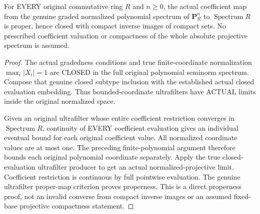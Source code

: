 \begin{theorem}
\label{spectrum:normalized-projective-coefficient-proper}
For EVERY original commutative ring $R$ and $n\ge0$, the actual coefficient map
from the genuine graded normalized polynomial spectrum of $\mathbf P^n_R$ to
$\operatorname{Spectrum}R$ is proper, hence closed with compact inverse images
of compact sets. No prescribed coefficient valuation or compactness of the whole
absolute projective spectrum is assumed.
\leanok
\end{theorem}
\begin{proof}
The actual gradedness conditions and true finite-coordinate normalization
$\max_i|X_i|=1$ are CLOSED in the full original polynomial seminorm spectrum.
Compose that genuine closed subtype inclusion with the established actual closed
evaluation embedding. Thus bounded-coordinate ultrafilters have ACTUAL limits
inside the original normalized space.

Given an original ultrafilter whose entire coefficient restriction converges in
$\operatorname{Spectrum}R$, continuity of EVERY coefficient evaluation gives
an individual eventual bound for each original coefficient value. All normalized
coordinate values are at most one. The preceding finite-polynomial argument
therefore bounds each original polynomial coordinate separately. Apply the true
closed-evaluation ultrafilter producer to get an actual normalized-projective
limit. Coefficient restriction is continuous by full pointwise evaluation.
The genuine ultrafilter proper-map criterion proves properness. This is a direct
properness proof, not an invalid converse from compact inverse images or an
assumed fixed-base projective compactness statement.
\end{proof}

